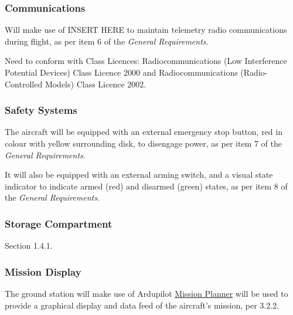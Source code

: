 \subsubsection*{Communications}
Will make use of INSERT HERE to maintain telemetry radio communications during flight, as per item 6 of the \textit{General Requirements}. 

Need to conform with Class Licences: Radiocommunications (Low Interference Potential Devices) Class Licence 2000 and Radiocommunications (Radio-Controlled Models) Class Licence 2002.

\subsubsection*{Safety Systems}
The aircraft will be equipped with an external emergency stop button, red in colour with yellow surrounding disk, to disengage power, as per item 7 of the \textit{General Requirements}.

It will also be equipped with an external arming switch, and a visual state indicator to indicate armed (red) and disarmed (green) states, as per item 8 of the \textit{General Requirements}.

\subsubsection*{Storage Compartment}
Section 1.4.1.

\subsubsection*{Mission Display}
The ground station will make use of Ardupilot \href{http://planner.ardupilot.com/}{Mission Planner} will be used to provide a graphical display and data feed of the aircraft's mission, per 3.2.2.